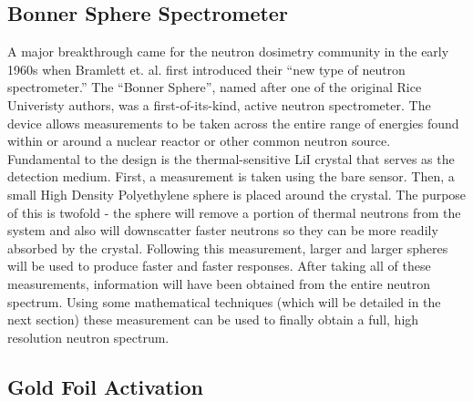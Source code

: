 \subsection{Bonner Sphere Spectrometer}
A major breakthrough came for the neutron dosimetry community in the early 1960s when Bramlett et. al. first introduced their ``new type of neutron spectrometer.''
The ``Bonner Sphere'', named after one of the original Rice Univeristy authors, was a first-of-its-kind, active neutron spectrometer.
The device allows measurements to be taken across the entire range of energies found within or around a nuclear reactor or other common neutron source.
Fundamental to the design is the thermal-sensitive LiI crystal that serves as the detection medium.
First, a measurement is taken using the bare sensor.
Then, a small High Density Polyethylene sphere is placed around the crystal.
The purpose of this is twofold - the sphere will remove a portion of thermal neutrons from the system and also will downscatter faster neutrons so they can be more readily absorbed by the crystal.
Following this measurement, larger and larger spheres will be used to produce faster and faster responses.
After taking all of these measurements, information will have been obtained from the entire neutron spectrum.
Using some mathematical techniques (which will be detailed in the next section) these measurement can be used to finally obtain a full, high resolution neutron spectrum.

\subsection{Gold Foil Activation}
